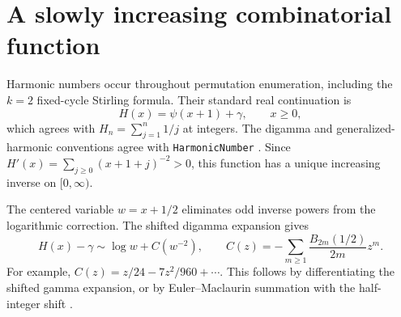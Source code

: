 \documentclass[11pt,openany]{book}
\numberwithin{equation}{chapter}
\theoremstyle{plain}
\theoremstyle{definition}
\theoremstyle{remark}
\begin{document}
\section{A slowly increasing combinatorial function}

Harmonic numbers occur throughout permutation enumeration, including the $k=2$ fixed-cycle Stirling formula. Their standard real continuation is
\begin{equation}
 H(x)=\psi(x+1)+\gamma,\qquad x\ge0,
 \label{t2:eq:harmonic-cont}
\end{equation}
which agrees with $H_n=\sum_{j=1}^n1/j$ at integers. The digamma and generalized-harmonic conventions agree with \texttt{HarmonicNumber} \cite{wlharmonic}. Since
$H'(x)=\sum_{j\ge0}(x+1+j)^{-2}>0$, this function has a unique increasing inverse on $[0,\infty)$.

The centered variable $w=x+1/2$ eliminates odd inverse powers from the logarithmic correction. The shifted digamma expansion gives
\begin{equation}
 H(x)-\gamma\sim\log w+C(w^{-2}),\qquad
 C(z)=-\sum_{m\ge1}\frac{B_{2m}(1/2)}{2m}z^m.
 \label{t2:eq:harmonic-centered}
\end{equation}
For example, $C(z)=z/24-7z^2/960+\cdots$. This follows by differentiating the shifted gamma expansion, or by Euler--Maclaurin summation with the half-integer shift \cite{dlmfgamma,dlmfbernoulli}.
\end{document}
